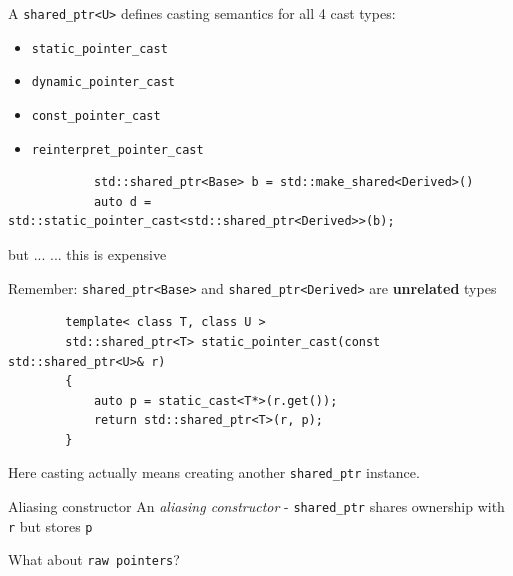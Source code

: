 \documentclass{beamer}
\begin{document}
\begin{frame}[fragile]
	A \texttt{shared\_ptr<U>} defines casting semantics for all 4 cast types:
	\begin{itemize}
		\item \texttt{static\_pointer\_cast}
		\item \texttt{dynamic\_pointer\_cast}
		\item \texttt{const\_pointer\_cast}
		\item \texttt{reinterpret\_pointer\_cast}
	\end{itemize}
	\begin{example}
		\begin{lstlisting}
			std::shared_ptr<Base> b = std::make_shared<Derived>()
			auto d = std::static_pointer_cast<std::shared_ptr<Derived>>(b);
		\end{lstlisting}
	\end{example}
	but ... \newline
	... this is expensive
\end{frame}

\begin{frame}[fragile,t]
	Remember: \texttt{shared\_ptr<Base>} and \texttt{shared\_ptr<Derived>} are 
					  \textbf{unrelated} types \newline \newline
	
	\begin{lstlisting}
		template< class T, class U > 
		std::shared_ptr<T> static_pointer_cast(const std::shared_ptr<U>& r)
		{
		    auto p = static_cast<T*>(r.get());
		    return std::shared_ptr<T>(r, p);
		}
	\end{lstlisting}
	\pause
	 Here casting actually means creating another \texttt{shared\_ptr} instance.
	\pause
	\begin{block}{Aliasing constructor}
		An \textit{aliasing constructor} - \texttt{shared\_ptr} shares
			  ownership with \texttt{r} but stores \texttt{p}
	\end{block}
\end{frame}

\begin{frame}
    \begin{center}
        What about \texttt{raw pointers}?
    \end{center}
\end{frame}
\end{document}

